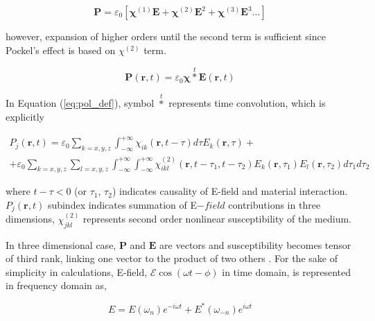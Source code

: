 \documentclass[thesis]{deutez}
\begin{document}
    \begin{equation}
        \mathbf{P} = \varepsilon_0 \left[ \bm\chi^{(1)} \mathbf{E}+\bm\chi^{(2)}\mathbf{E}^{2} +\bm\chi^{(3)}\mathbf{E}^{3} \dots  \right]
        \label{eq:pol_lin_nonlin}
    \end{equation}
    
    however, expansion of higher orders until the second term is sufficient since Pockel's effect is based on $\chi^{(2)}$ term.

    \begin{equation}
        \mathbf{P}(\mathbf{r},t) = \varepsilon_0 \bm\chi \overset{t}{\ast} \mathbf{E}(\mathbf{r},t)
        \label{eq:pol_def}
    \end{equation}

    In Equation (\ref{eq:pol_def}), symbol $\overset{t}{\ast}$ represents time convolution, which is explicitly

    \begin{equation}
        \begin{split}
        P_j(\mathbf{r},t) = \varepsilon_0 \sum_{k=x,y,z}\int_{-\infty}^{+\infty} \chi_{ik}(\mathbf{r},t-\tau)d\tau E_k(\mathbf{r},\tau) + \\ 
        + \varepsilon_0 \sum_{k=x,y,z}\sum_{l=x,y,z}\int_{-\infty}^{+\infty} \int_{-\infty}^{+\infty} \chi_{ikl}^{(2)}(\mathbf{r},t-\tau_1,t-\tau_2) E_k(\mathbf{r},\tau_1) E_l(\mathbf{r},\tau_2) d\tau_1 d\tau_2 
        \label{eq:pol_conv_explicit}
        \end{split}
    \end{equation}
    
    where $t-\tau<0$ (or $\tau_1$, $\tau_2$)  indicates causality of E-field and material interaction. $P_j(\mathbf{r},t)$ subindex indicates summation of E$-{field}$ contributions in three dimensions,  $\chi_{jkl}^{(2)}$ represents second order nonlinear susceptibility of the medium.

    In three dimensional case, $\mathbf{P}$ and $\mathbf{E}$ are vectors and susceptibility becomes tensor of third rank, linking one vector to the product of two others \cite{11}. For the sake of simplicity in calculations, E-field, $\mathcal{E} \cos(\omega t -\phi)$ in time domain, is represented in frequency domain as,

    \begin{equation}
        E = E(\omega_n) e^{-i\omega t} + E^*(\omega_{-n}) e^{i\omega t}
        \label{eq:e-field_freq}
    \end{equation}
\end{document}
